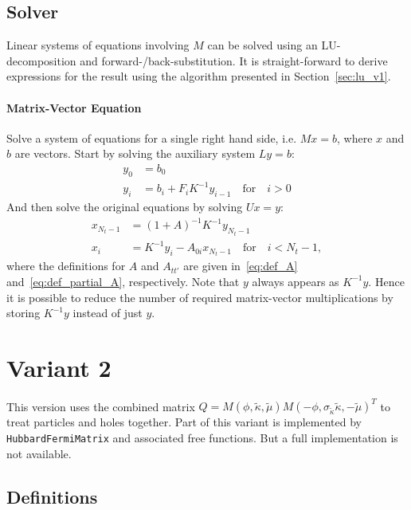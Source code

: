 \documentclass[a4paper, fleqn, twoside, notitlepage]{scrartcl}
\begin{document}
\subsection{Solver}\label{sec:solver_v1}

Linear systems of equations involving $M$ can be solved using an LU-decomposition and forward-/back-substitution.
It is straight-forward to derive expressions for the result using the algorithm presented in Section~\ref{sec:lu_v1}.

\paragraph{Matrix-Vector Equation}
Solve a system of equations for a single right hand side, i.e. $M x = b$, where $x$ and $b$ are vectors.
Start by solving the auxiliary system $L y = b$:
\begin{align}
  y_0 &= b_0\\
  y_i &= b_i + F_i K^{-1}y_{i-1} \quad \text{for} \quad i > 0
\end{align}
And then solve the original equations by solving $U x = y$:
\begin{align}
  x_{N_t-1} &= {(1+A)}^{-1} K^{-1} y_{N_t-1}\\
  x_i &= K^{-1} y_i - A_{0i}x_{N_t-1} \quad \text{for} \quad i < N_t-1,
\end{align}
where the definitions for $A$ and $A_{tt'}$ are given in~\eqref{eq:def_A} and~\eqref{eq:def_partial_A}, respectively.
Note that $y$ always appears as $K^{-1}y$. Hence it is possible to reduce the number of required matrix-vector multiplications by storing $K^{-1}y$ instead of just $y$.


\clearpage
\section{Variant 2}

This version uses the combined matrix $Q = M(\phi, \tilde{\kappa}, \tilde{\mu}) {M(-\phi, \sigma_{\tilde{\kappa}}\tilde{\kappa}, -\tilde{\mu})}^T$ to treat particles and holes together.
Part of this variant is implemented by \texttt{HubbardFermiMatrix} and associated free functions. But a full implementation is not available.

\subsection{Definitions}
\end{document}
